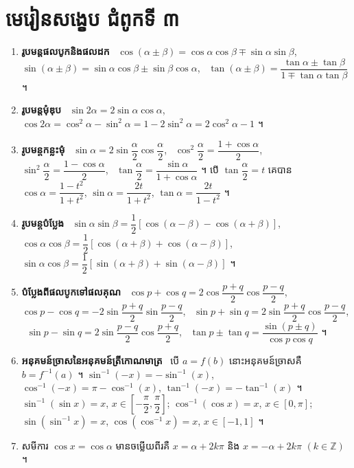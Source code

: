 \section*{មេរៀនសង្ខេប ជំពូកទី ៣}
\begin{note}[មេរៀនសង្ខេប]
\begin{enumerate}[1]
  \item \textbf{រូបមន្តផលបូកនិងផលដក} \
  $\cos(\alpha \pm \beta) = \cos\alpha\cos\beta \mp \sin\alpha\sin\beta$, \ $\sin(\alpha \pm \beta) = \sin\alpha\cos\beta \pm \sin\beta\cos\alpha$, \ $\tan(\alpha \pm \beta) = \dfrac{\tan\alpha \pm \tan\beta}{1 \mp \tan\alpha\tan\beta}$ ។
  \item \textbf{រូបមន្តមុំឌុប} \ $\sin 2\alpha = 2\sin\alpha\cos\alpha$, \ $\cos 2\alpha = \cos^2\alpha - \sin^2\alpha = 1 - 2\sin^2\alpha = 2\cos^2\alpha - 1$ ។
  \item \textbf{រូបមន្តកន្លះមុំ} \ $\sin\alpha = 2\sin\dfrac{\alpha}{2}\cos\dfrac{\alpha}{2}$, \ $\cos^2\dfrac{\alpha}{2} = \dfrac{1 + \cos\alpha}{2}$, \ $\sin^2\dfrac{\alpha}{2} = \dfrac{1 - \cos\alpha}{2}$, \ $\tan\dfrac{\alpha}{2} = \dfrac{\sin\alpha}{1 + \cos\alpha}$ ។ បើ $\tan\dfrac{\alpha}{2} = t$ គេបាន $\cos\alpha = \dfrac{1 - t^2}{1 + t^2}$, $\sin\alpha = \dfrac{2t}{1 + t^2}$, $\tan\alpha = \dfrac{2t}{1 - t^2}$ ។
  \item \textbf{រូបមន្តបំប្លែង} \ $\sin\alpha\sin\beta = \dfrac{1}{2}[\cos(\alpha - \beta) - \cos(\alpha + \beta)]$, \ $\cos\alpha\cos\beta = \dfrac{1}{2}[\cos(\alpha + \beta) + \cos(\alpha - \beta)]$, \ $\sin\alpha\cos\beta = \dfrac{1}{2}[\sin(\alpha + \beta) + \sin(\alpha - \beta)]$ ។
  \item \textbf{បំប្លែងពីផលបូកទៅផលគុណ} \ $\cos p + \cos q = 2\cos\dfrac{p + q}{2}\cos\dfrac{p - q}{2}$, \ $\cos p - \cos q = -2\sin\dfrac{p + q}{2}\sin\dfrac{p - q}{2}$, \ $\sin p + \sin q = 2\sin\dfrac{p + q}{2}\cos\dfrac{p - q}{2}$, \ $\sin p - \sin q = 2\sin\dfrac{p - q}{2}\cos\dfrac{p + q}{2}$, \ $\tan p \pm \tan q = \dfrac{\sin(p \pm q)}{\cos p\cos q}$ ។
  \item \textbf{អនុគមន៍ច្រាសនៃអនុគមន៍ត្រីកោណមាត្រ} \ បើ $a = f(b)$ នោះអនុគមន៍ច្រាសគឺ $b = f^{-1}(a)$ ។ $\sin^{-1}(-x) = -\sin^{-1}(x)$, $\cos^{-1}(-x) = \pi - \cos^{-1}(x)$, $\tan^{-1}(-x) = -\tan^{-1}(x)$ ។ $\sin^{-1}(\sin x) = x$, $x \in \left[-\dfrac{\pi}{2}, \dfrac{\pi}{2}\right]$; $\cos^{-1}(\cos x) = x$, $x \in [0, \pi]$; $\sin(\sin^{-1}x) = x$, $\cos(\cos^{-1}x) = x$, $x \in [-1, 1]$ ។
  \item សមីការ $\cos x = \cos\alpha$ មានចម្លើយពីរគឺ $x = \alpha + 2k\pi$ និង $x = -\alpha + 2k\pi$ $(k \in \mathbb{Z})$ ។

\end{enumerate}
\end{note}
